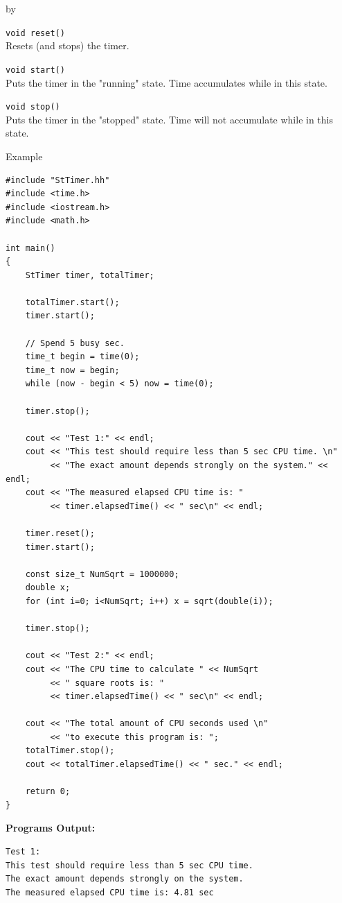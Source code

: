 \documentclass[twoside]{article}
\newcommand{\entrylabel}[1]{\mbox{\textbf{{#1}}}\hfil}%
\newenvironment{entry}
{\begin{list}{}%
    {\renewcommand{\makelabel}{\entrylabel}%
     \setlength{\labelwidth}{90pt}%
     \setlength{\leftmargin}{\labelwidth}
     \advance\leftmargin by \labelsep%
      }%
    }%
  {\end{list}}
\newcommand{\Entrylabel}[1]%
{\raisebox{0pt}[1ex][0pt]{\makebox[\labelwidth][l]%
    {\parbox[t]{\labelwidth}{\hspace{0pt}\textbf{{#1}}}}}}
\newenvironment{Entry}%
{\renewcommand{\entrylabel}{\Entrylabel}\begin{entry}}%
  {\end{entry}}
\begin{document}
\begin{description}
\begin{Entry}
    \verb+void reset()+\\
    Resets (and stops) the timer.
 
    \verb+void start()+\\
    Puts the timer in the "running" state. Time accumulates while
    in this state.

    \verb+void stop()+\\
    Puts the timer in the "stopped" state. Time will not accumulate
    while in this state.

\item[Example]
{\footnotesize
\begin{verbatim}
#include "StTimer.hh"
#include <time.h>
#include <iostream.h>
#include <math.h>

int main()
{   
    StTimer timer, totalTimer;
    
    totalTimer.start();
    timer.start();
    
    // Spend 5 busy sec.
    time_t begin = time(0);
    time_t now = begin;
    while (now - begin < 5) now = time(0);
    
    timer.stop();
    
    cout << "Test 1:" << endl;
    cout << "This test should require less than 5 sec CPU time. \n"
         << "The exact amount depends strongly on the system." << endl;
    cout << "The measured elapsed CPU time is: "
         << timer.elapsedTime() << " sec\n" << endl;
    
    timer.reset();
    timer.start();
    
    const size_t NumSqrt = 1000000;
    double x;
    for (int i=0; i<NumSqrt; i++) x = sqrt(double(i));
    
    timer.stop();
    
    cout << "Test 2:" << endl;
    cout << "The CPU time to calculate " << NumSqrt
         << " square roots is: "
         << timer.elapsedTime() << " sec\n" << endl;
    
    cout << "The total amount of CPU seconds used \n"
         << "to execute this program is: ";
    totalTimer.stop();
    cout << totalTimer.elapsedTime() << " sec." << endl;
    
    return 0;
}
\end{verbatim}

{\bf Programs Output:}

\begin{verbatim}
Test 1:
This test should require less than 5 sec CPU time. 
The exact amount depends strongly on the system.
The measured elapsed CPU time is: 4.81 sec


\end{verbatim}}
\end{Entry}
\end{description}
\end{document}
